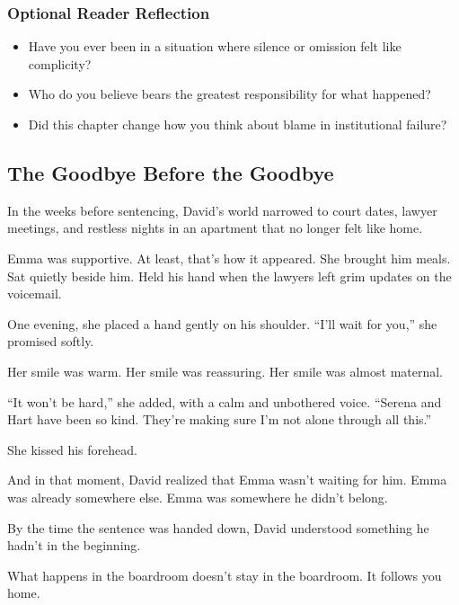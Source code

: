 \subsubsection{Optional Reader Reflection}

\begin{itemize}
\item Have you ever been in a situation where silence or omission felt like complicity?
\item Who do you believe bears the greatest responsibility for what happened?
\item Did this chapter change how you think about blame in institutional failure?
\end{itemize}





\subsection{The Goodbye Before the Goodbye}

In the weeks before sentencing, David’s world narrowed to court dates, lawyer meetings, and restless 
nights in an apartment that no longer felt like home.

Emma was supportive. At least, that’s how it appeared.  
She brought him meals. Sat quietly beside him. Held his hand when the lawyers left grim updates on the voicemail.

One evening, she placed a hand gently on his shoulder.  
“I’ll wait for you,” she promised softly.  

Her smile was warm. Her smile was reassuring. Her smile was almost maternal.  

“It won’t be hard,” she added, with a calm and unbothered voice.
“Serena and Hart have been so kind. They’re making sure I’m not alone through all this.”

She kissed his forehead.

And in that moment, David realized that 
Emma wasn’t waiting for him.  
Emma was already somewhere else.  
Emma was somewhere he didn't belong.

By the time the sentence was handed down,  
David understood something he hadn’t in the beginning. 

What happens in the boardroom doesn't stay in the boardroom.  It follows you home.

\medskip

